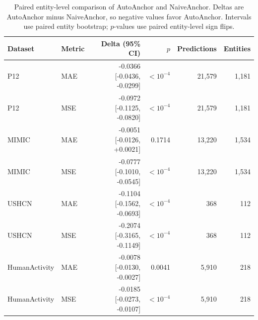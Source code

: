 \begin{table}[t]
\caption{Paired entity-level comparison of AutoAnchor and NaiveAnchor. 
Deltas are AutoAnchor minus NaiveAnchor, so negative values favor AutoAnchor. 
Intervals use paired entity bootstrap; $p$-values use paired entity-level sign flips.}
\label{tab:paired-anchor-tests}
\centering
\scriptsize
\begin{tabular}{llrrrr}
\toprule
Dataset & Metric & Delta (95\% CI) & $p$ & Predictions & Entities \\
\midrule
P12 & MAE & -0.0366 [-0.0436, -0.0299] & $<10^{-4}$ & 21,579 & 1,181 \\
P12 & MSE & -0.0972 [-0.1125, -0.0820] & $<10^{-4}$ & 21,579 & 1,181 \\
MIMIC & MAE & -0.0051 [-0.0126, +0.0021] & 0.1714 & 13,220 & 1,534 \\
MIMIC & MSE & -0.0777 [-0.1010, -0.0545] & $<10^{-4}$ & 13,220 & 1,534 \\
USHCN & MAE & -0.1104 [-0.1562, -0.0693] & $<10^{-4}$ & 368 & 112 \\
USHCN & MSE & -0.2074 [-0.3165, -0.1149] & $<10^{-4}$ & 368 & 112 \\
HumanActivity & MAE & -0.0078 [-0.0130, -0.0027] & 0.0041 & 5,910 & 218 \\
HumanActivity & MSE & -0.0185 [-0.0273, -0.0107] & $<10^{-4}$ & 5,910 & 218 \\
\bottomrule
\end{tabular}
\end{table}
